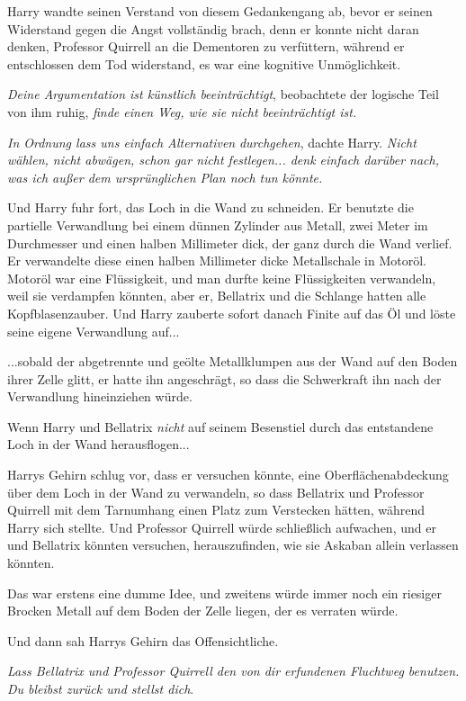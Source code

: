 {Harry wandte seinen Verstand von diesem Gedankengang ab, bevor er seinen Widerstand gegen die Angst vollständig brach, denn er konnte nicht daran denken, Professor Quirrell an die Dementoren zu verfüttern, während er entschlossen dem Tod widerstand, es war eine kognitive Unmöglichkeit.

\emph{Deine Argumentation ist künstlich beeinträchtigt}, beobachtete der logische Teil von ihm ruhig, \emph{finde einen Weg, wie sie nicht beeinträchtigt ist.}

\emph{In Ordnung lass uns einfach Alternativen} \emph{durchgehen}, dachte Harry. \emph{Nicht wählen, nicht abwägen, schon gar nicht festlegen... denk einfach darüber nach, was ich außer dem ursprünglichen Plan noch tun könnte.}

Und Harry fuhr fort, das Loch in die Wand zu schneiden. Er benutzte die partielle Verwandlung bei einem dünnen Zylinder aus Metall, zwei Meter im Durchmesser und einen halben Millimeter dick, der ganz durch die Wand verlief. Er verwandelte diese einen halben Millimeter dicke Metallschale in Motoröl. Motoröl war eine Flüssigkeit, und man durfte keine Flüssigkeiten verwandeln, weil sie verdampfen könnten, aber er, Bellatrix und die Schlange hatten alle Kopfblasenzauber. Und Harry zauberte sofort danach Finite auf das Öl und löste seine eigene Verwandlung auf...

...sobald der abgetrennte und geölte Metallklumpen aus der Wand auf den Boden ihrer Zelle glitt, er hatte ihn angeschrägt, so dass die Schwerkraft ihn nach der Verwandlung hineinziehen würde.

Wenn Harry und Bellatrix \emph{nicht} auf seinem Besenstiel durch das entstandene Loch in der Wand herausflogen...

Harrys Gehirn schlug vor, dass er versuchen könnte, eine Oberflächenabdeckung über dem Loch in der Wand zu verwandeln, so dass Bellatrix und Professor Quirrell mit dem Tarnumhang einen Platz zum Verstecken hätten, während Harry sich stellte. Und Professor Quirrell würde schließlich aufwachen, und er und Bellatrix könnten versuchen, herauszufinden, wie sie Askaban allein verlassen könnten.

Das war erstens eine dumme Idee, und zweitens würde immer noch ein riesiger Brocken Metall auf dem Boden der Zelle liegen, der es verraten würde.

Und dann sah Harrys Gehirn das Offensichtliche.

\emph{Lass Bellatrix und Professor Quirrell den von dir erfundenen Fluchtweg benutzen. Du bleibst zurück und stellst dich}.

}
